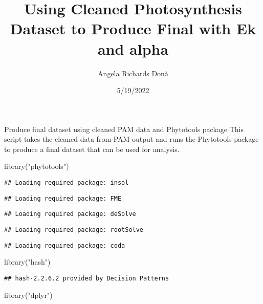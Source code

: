 \documentclass[
]{article}
\title{Using Cleaned Photosynthesis Dataset to Produce Final with Ek and
alpha}
\author{Angela Richards Donà}
\date{5/19/2022}
\newenvironment{Shaded}{\begin{snugshade}}{\end{snugshade}}
\newcommand{\FunctionTok}[1]{\textcolor[rgb]{0.00,0.00,0.00}{#1}}
\newcommand{\NormalTok}[1]{#1}
\newcommand{\StringTok}[1]{\textcolor[rgb]{0.31,0.60,0.02}{#1}}
\begin{document}
\maketitle

Produce final dataset using cleaned PAM data and Phytotools package This
script takes the cleaned data from PAM output and runs the Phytotools
package to produce a final dataset that can be used for analysis.

\begin{Shaded}
\begin{Highlighting}[]
\FunctionTok{library}\NormalTok{(}\StringTok{"phytotools"}\NormalTok{)}
\end{Highlighting}
\end{Shaded}

\begin{verbatim}
## Loading required package: insol
\end{verbatim}

\begin{verbatim}
## Loading required package: FME
\end{verbatim}

\begin{verbatim}
## Loading required package: deSolve
\end{verbatim}

\begin{verbatim}
## Loading required package: rootSolve
\end{verbatim}

\begin{verbatim}
## Loading required package: coda
\end{verbatim}

\begin{Shaded}
\begin{Highlighting}[]
\FunctionTok{library}\NormalTok{(}\StringTok{"hash"}\NormalTok{)}
\end{Highlighting}
\end{Shaded}

\begin{verbatim}
## hash-2.2.6.2 provided by Decision Patterns
\end{verbatim}

\begin{Shaded}
\begin{Highlighting}[]
\FunctionTok{library}\NormalTok{(}\StringTok{"dplyr"}\NormalTok{)}
\end{Highlighting}
\end{Shaded}
\end{document}
